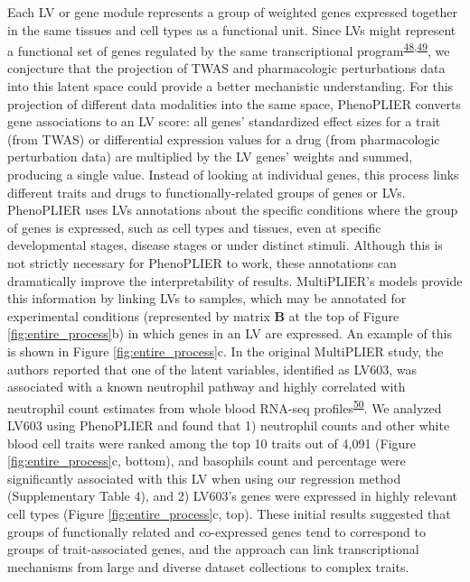 \documentclass[
  a4paper,
]{article}
\begin{document}
Each LV or gene module represents a group of weighted genes expressed together in the same tissues and cell types as a functional unit.
Since LVs might represent a functional set of genes regulated by the same transcriptional program\textsuperscript{\protect\hyperlink{ref-1FVd2WW6G}{48},\protect\hyperlink{ref-DN7TyZzb}{49}}, we conjecture that the projection of TWAS and pharmacologic perturbations data into this latent space could provide a better mechanistic understanding.
For this projection of different data modalities into the same space, PhenoPLIER converts gene associations to an LV score: all genes' standardized effect sizes for a trait (from TWAS) or differential expression values for a drug (from pharmacologic perturbation data) are multiplied by the LV genes' weights and summed, producing a single value.
Instead of looking at individual genes, this process links different traits and drugs to functionally-related groups of genes or LVs.
PhenoPLIER uses LVs annotations about the specific conditions where the group of genes is expressed, such as cell types and tissues, even at specific developmental stages, disease stages or under distinct stimuli.
Although this is not strictly necessary for PhenoPLIER to work, these annotations can dramatically improve the interpretability of results.
MultiPLIER's models provide this information by linking LVs to samples, which may be annotated for experimental conditions (represented by matrix \(\mathbf{B}\) at the top of Figure \ref{fig:entire_process}b) in which genes in an LV are expressed.
An example of this is shown in Figure \ref{fig:entire_process}c.
In the original MultiPLIER study, the authors reported that one of the latent variables, identified as LV603, was associated with a known neutrophil pathway and highly correlated with neutrophil count estimates from whole blood RNA-seq profiles\textsuperscript{\protect\hyperlink{ref-18TSqd1tG}{50}}.
We analyzed LV603 using PhenoPLIER and found that
1) neutrophil counts and other white blood cell traits were ranked among the top 10 traits out of 4,091 (Figure \ref{fig:entire_process}c, bottom), and basophils count and percentage were significantly associated with this LV when using our regression method (Supplementary Table 4),
and 2) LV603's genes were expressed in highly relevant cell types (Figure \ref{fig:entire_process}c, top).
These initial results suggested that groups of functionally related and co-expressed genes tend to correspond to groups of trait-associated genes, and the approach can link transcriptional mechanisms from large and diverse dataset collections to complex traits.
\end{document}
